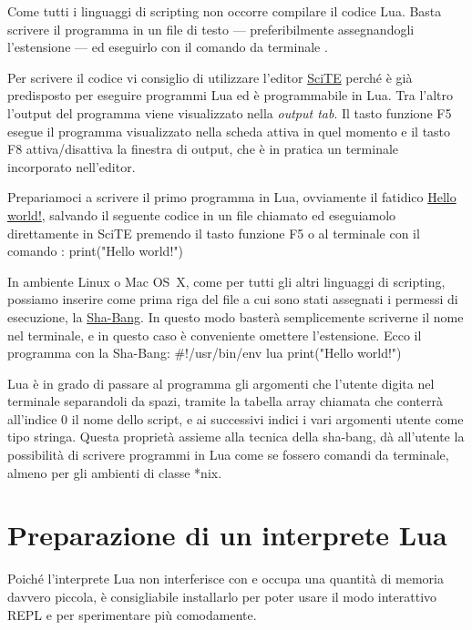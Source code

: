 


Come tutti i linguaggi di scripting non occorre compilare il codice Lua. Basta
scrivere il programma in un file di testo --- preferibilmente assegnandogli
l'estensione  --- ed eseguirlo con il comando da terminale .

Per scrivere il codice vi consiglio di utilizzare l'editor
\href{http://www.scintilla.org/SciTE.html}{SciTE} perché è già predisposto per
eseguire programmi Lua ed è programmabile in Lua. Tra l'altro l'output del
programma viene visualizzato nella \emph{output tab}. Il tasto funzione F5
esegue il programma visualizzato nella scheda attiva in quel momento e il tasto
F8 attiva/disattiva la finestra di output, che è in pratica un terminale
incorporato nell'editor.

Prepariamoci a scrivere il primo programma in Lua, ovviamente il fatidico
\href{http://en.wikipedia.org/wiki/%22Hello,_world!%22_program"}{Hello world!},
salvando il seguente codice in un file chiamato  ed eseguiamolo
direttamente in SciTE premendo il tasto funzione F5 o al terminale con il
comando :
\lines
print("Hello world!")
\endlines
{}

In ambiente Linux o Mac OS~X, come per tutti gli altri linguaggi di scripting,
possiamo inserire come prima riga del file a cui sono stati assegnati i permessi
di esecuzione, la
\href{http://en.wikipedia.org/wiki/Shebang_%28Unix%29}{Sha-Bang}. In questo modo
basterà semplicemente scriverne il nome nel terminale, e in questo caso è
conveniente omettere l'estensione. Ecco il programma con la Sha-Bang:
\lines
#!/usr/bin/env lua
print("Hello world!")
\endlines
{}

Lua è in grado di passare al programma gli argomenti che l'utente digita nel
terminale separandoli da spazi, tramite la tabella array chiamata  che
conterrà all'indice 0 il nome dello script, e ai successivi indici i vari
argomenti utente come tipo stringa. Questa proprietà assieme alla tecnica della
sha-bang, dà all'utente la possibilità di scrivere programmi in Lua come se
fossero comandi da terminale, almeno per gli ambienti di classe *nix.

\chapter{Preparazione di un interprete Lua}

Poiché l'interprete Lua non interferisce con \LuaTeX{} e occupa una quantità di
memoria davvero piccola, è consigliabile installarlo per poter usare il modo
interattivo REPL e per sperimentare più comodamente.

